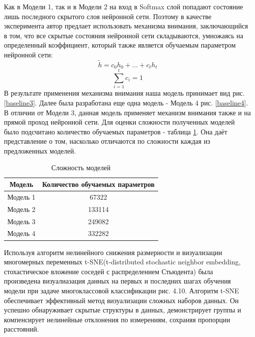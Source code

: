     Как в Модели 1, так и в Модели 2 на вход в Softmax слой попадают состояние лишь последного скрытого слоя нейронной сети. Поэтому в качестве эксперимента автор предлает использовать механизма внимания, заключающийся в том, что все скрытые состояния нейронной сети складываются, умножаясь на определенный коэффициент, который также является обучаемым параметром нейронной сети:
    \begin{equation}\label{attention}
    \tilde{h} = c_{0}h_{0}+...+c_{t}h_{t}
    \end{equation}
    \begin{equation}\label{coeff}
    \sum_{i=1}^{t} c_{i}=1
    \end{equation}
    В результате применения механизма внимания наша модель принимает вид рис. \ref{baseline3}.
    Далее была разработана еще одна модель - Модель 4 рис. \ref{baseline4}. В отличии от Модели 3, данная модель применяет механизм внимания также и на прямой проход нейронной сети.
    Для оценки сложности полученных моделей было подсчитано количество обучаемых параметров - таблица \ref{hard}. Она даёт представление о том, насколько отличаются по сложности каждая из предложенных моделей.
    \begin{table}[H]
    \centering
    \caption{Сложность моделей}\label{hard}
    \begin{tabular}{@{}cc@{}}
    \toprule
    Модель         & Количество обучаемых параметров \\ \midrule
    Модель 1 & 67322     \\
    Модель 2 & 133114      \\
    Модель 3 & 249082    \\
    Модель 4 & 332282   \\ \bottomrule
    \end{tabular}
    \end{table}

    Используя алгоритм нелинейного снижения размерности и визуализации многомерных переменных t-SNE(t-distributed stochastic neighbor embedding, стохастическое вложение соседей с распределением Стьюдента) была произведена визуалиазация данных на первых и последних шагах обучения модели при задаче многоклассовой классификации рис. 4.10. Алгоритм t-SNE обеспечивает эффективный метод визуализации сложных наборов данных. Он успешно обнаруживает скрытые структуры в данных, демонстрирует группы и компенсирует нелинейные отклонения по измерениям, сохраняя пропорции расстояний.

